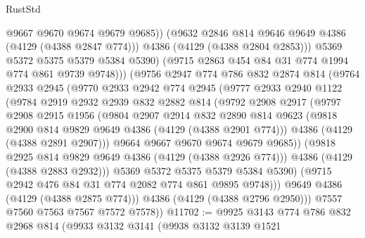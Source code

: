 \begin{lexlean}{RustStd}
\begin{coremodule}
{\begin{coremodule}
{{{{{{{{{{{{{{                      @9667
                      @9670
                      @9674
                      @9679
                      @9685))
                  (@9632 @2846 @814 @9646 @9649 @4386 (@4129 (@4388 @2847 @774)))
                  @4386
                  (@4129 (@4388 @2804 @2853)))
                @5369
                @5372
                @5375
                @5379
                @5384
                @5390)
              (@9715 @2863 @454 @84 @31 @774 @1994 @774 @861 @9739 @9748)))
          (@9756
            @2947
            @774
            @786
            @832
            @2874
            @814
            (@9764
              @2933
              @2945
              (@9770
                @2933
                @2942
                @774
                @2945
                (@9777
                  @2933
                  @2940
                  @1122
                  (@9784
                    @2919
                    @2932
                    @2939
                    @832
                    @2882
                    @814
                    (@9792
                      @2908
                      @2917
                      (@9797
                        @2908
                        @2915
                        @1956
                        (@9804
                          @2907
                          @2914
                          @832
                          @2890
                          @814
                          @9623
                          (@9818 @2900 @814 @9829 @9649 @4386 (@4129 (@4388 @2901 @774)))
                          @4386
                          (@4129 (@4388 @2891 @2907)))
                        @9664
                        @9667
                        @9670
                        @9674
                        @9679
                        @9685))
                    (@9818 @2925 @814 @9829 @9649 @4386 (@4129 (@4388 @2926 @774)))
                    @4386
                    (@4129 (@4388 @2883 @2932)))
                  @5369
                  @5372
                  @5375
                  @5379
                  @5384
                  @5390)
                (@9715 @2942 @476 @84 @31 @774 @2082 @774 @861 @9895 @9748)))
            @9649
            @4386
            (@4129 (@4388 @2875 @774)))
          @4386
          (@4129 (@4388 @2796 @2950)))
        @7557
        @7560
        @7563
        @7567
        @7572
        @7578))
@11702 := @9925
    @3143
    @774
    @786
    @832
    @2968
    @814
    (@9933
      @3132
      @3141
      (@9938
        @3132
        @3139
        @1521
}}}}}}}}}}}}}}
\end{coremodule}}
\end{coremodule}
\end{lexlean}
